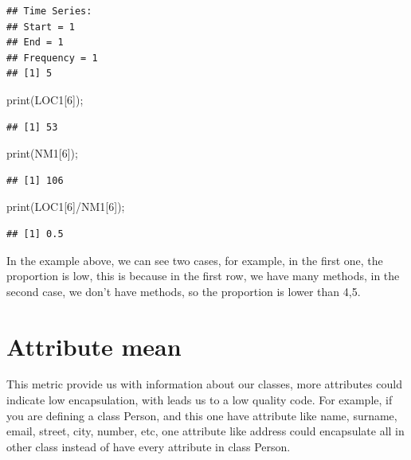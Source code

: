 \documentclass[
]{article}
\newenvironment{Shaded}{\begin{snugshade}}{\end{snugshade}}
\newcommand{\DecValTok}[1]{\textcolor[rgb]{0.00,0.00,0.81}{#1}}
\newcommand{\FunctionTok}[1]{\textcolor[rgb]{0.00,0.00,0.00}{#1}}
\newcommand{\NormalTok}[1]{#1}
\newcommand{\SpecialCharTok}[1]{\textcolor[rgb]{0.00,0.00,0.00}{#1}}
\begin{document}
\begin{verbatim}
## Time Series:
## Start = 1 
## End = 1 
## Frequency = 1 
## [1] 5
\end{verbatim}

\begin{Shaded}
\begin{Highlighting}[]
\FunctionTok{print}\NormalTok{(LOC1[}\DecValTok{6}\NormalTok{]);}
\end{Highlighting}
\end{Shaded}

\begin{verbatim}
## [1] 53
\end{verbatim}

\begin{Shaded}
\begin{Highlighting}[]
\FunctionTok{print}\NormalTok{(NM1[}\DecValTok{6}\NormalTok{]);}
\end{Highlighting}
\end{Shaded}

\begin{verbatim}
## [1] 106
\end{verbatim}

\begin{Shaded}
\begin{Highlighting}[]
\FunctionTok{print}\NormalTok{(LOC1[}\DecValTok{6}\NormalTok{]}\SpecialCharTok{/}\NormalTok{NM1[}\DecValTok{6}\NormalTok{]);}
\end{Highlighting}
\end{Shaded}

\begin{verbatim}
## [1] 0.5
\end{verbatim}

In the example above, we can see two cases, for example, in the first
one, the proportion is low, this is because in the first row, we have
many methods, in the second case, we don't have methods, so the
proportion is lower than 4,5.

\hypertarget{attribute-mean}{%
\section{Attribute mean}\label{attribute-mean}}

This metric provide us with information about our classes, more
attributes could indicate low encapsulation, with leads us to a low
quality code. For example, if you are defining a class Person, and this
one have attribute like name, surname, email, street, city, number, etc,
one attribute like address could encapsulate all in other class instead
of have every attribute in class Person.
\end{document}
